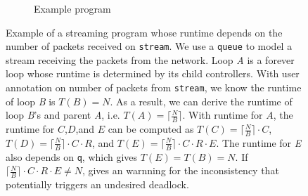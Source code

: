 \begin{figure}
\centering
\begin{subfigure}[b]{0.8\textwidth}
\inputminted{python}{code/runtime.py}
\caption{Example program}
\end{subfigure}
\caption[Runtime Analysis]{
  Example of a streaming program whose runtime depends on the number of packets received on
  \texttt{stream}. We use a \texttt{queue} to model a stream receiving the packets from the
  network.
  Loop \emph{A} is a forever loop whose runtime is determined by its child controllers.
  With user annotation on number of packets from \texttt{stream}, 
  we know the runtime of loop \emph{B} is $T(B) = N$.
  As a result, we can derive the runtime of loop \emph{B}'s and parent \emph{A}, 
  i.e. $T(A) = \lceil\frac{N}{B}\rceil$. 
  With runtime for $A$, the runtime for $C$,$D$,and $E$ can be computed as
  $T(C) = \lceil\frac{N}{B}\rceil\cdot C$,
  $T(D) = \lceil\frac{N}{B}\rceil\cdot C \cdot R$, 
  and $T(E) = \lceil\frac{N}{B}\rceil\cdot C \cdot R \cdot E$.
  The runtime for \emph{E} also depends on \texttt{q}, which gives $T(E) = T(B) = N$. 
  If $\lceil\frac{N}{B}\rceil\cdot C \cdot R \cdot E \neq N$, \name gives an warnning for the
  inconsistency that potentially triggers an undesired deadlock.
}
\label{fig:msr}
\end{figure}
